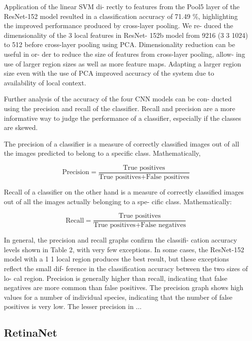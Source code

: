 Application of the linear SVM di- rectly to features from the Pool5 layer of the ResNet-152 model resulted in a classification accuracy of 71.49 \%, highlighting the improved performance produced by cross-layer pooling. We re- duced the dimensionality of the 3 local features in ResNet- 152b model from 9216 (3 3 1024) to 512 before cross-layer pooling using PCA. Dimensionality reduction can be useful in or- der to reduce the size of features from cross-layer pooling, allow- ing use of larger region sizes as well as more feature maps. Adapting a larger region size even with the use of PCA improved accuracy of the system due to availability of local context. 

Further analysis of the accuracy of the four CNN models can be con- ducted using the precision and recall of the classifier. Recall and precision are a more informative way to judge the performance of a classifier, especially if the classes are skewed.

The precision of a classifier is a measure of correctly classified images out of all the images predicted to belong to a specific class. Mathematically,

\begin{equation}
\text{Precision} = \frac{\text{True positives}}{\text{True positives} + \text{False positives}}
\end{equation}

Recall of a classifier on the other hand is a measure of correctly classified images out of all the images actually belonging to a spe- cific class. Mathematically:

\begin{equation}
\text{Recall} = \frac{\text{True positives}}{\text{True positives} + \text{False negatives}}
\end{equation}

In general, the precision and recall graphs confirm the classifi- cation accuracy levels shown in Table 2, with very few exceptions. In some cases, the ResNet-152 model with a 1 1 local region produces the best result, but these exceptions reflect the small dif- ference in the classification accuracy between the two sizes of lo- cal region. Precision is generally higher than recall, indicating that false negatives are more common than false positives. The precision graph shows high values for a number of individual species, indicating that the number of false positives is very low. The lesser precision in ...

\subsection{RetinaNet}

